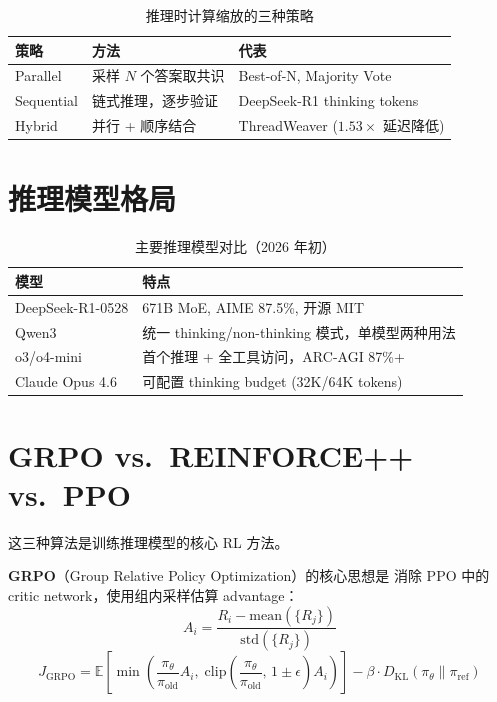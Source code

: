 \documentclass[
  customlatinfont = macos,
]{hkustthesis}
\begin{document}
\begin{table}[H]
\centering\small
\caption{推理时计算缩放的三种策略}
\begin{tabularx}{\linewidth}{l l X}
\toprule
\textbf{策略} & \textbf{方法} & \textbf{代表} \\
\midrule
Parallel   & 采样 $N$ 个答案取共识 & Best-of-N, Majority Vote \\
Sequential & 链式推理，逐步验证   & DeepSeek-R1 thinking tokens \\
Hybrid     & 并行 + 顺序结合     & ThreadWeaver ($1.53\times$ 延迟降低) \\
\bottomrule
\end{tabularx}
\end{table}

\section{推理模型格局}

\begin{table}[H]
\centering\small
\caption{主要推理模型对比（2026 年初）}
\label{tab:reasoning-models}
\begin{tabularx}{\linewidth}{l X}
\toprule
\textbf{模型} & \textbf{特点} \\
\midrule
DeepSeek-R1-0528 & 671B MoE, AIME 87.5\%, 开源 MIT \\
Qwen3            & 统一 thinking/non-thinking 模式，单模型两种用法 \\
o3/o4-mini       & 首个推理 + 全工具访问，ARC-AGI 87\%+ \\
Claude Opus 4.6  & 可配置 thinking budget (32K/64K tokens) \\
\bottomrule
\end{tabularx}
\end{table}

\section{GRPO vs.\ REINFORCE++ vs.\ PPO}

这三种算法是训练推理模型的核心 RL 方法。

\textbf{GRPO}（Group Relative Policy Optimization）的核心思想是
消除 PPO 中的 critic network，使用组内采样估算 advantage：
\begin{equation}
  A_i = \frac{R_i - \mathrm{mean}(\{R_j\})}{\mathrm{std}(\{R_j\})}
  \label{eq:grpo-advantage}
\end{equation}
\begin{equation}
  J_{\mathrm{GRPO}} = \mathbb{E}\!\left[
    \min\!\left(\frac{\pi_\theta}{\pi_{\mathrm{old}}} A_i,\;
    \mathrm{clip}\!\left(\frac{\pi_\theta}{\pi_{\mathrm{old}}},\,1\!\pm\!\epsilon\right) A_i\right)
  \right] - \beta \cdot D_{\mathrm{KL}}(\pi_\theta \| \pi_{\mathrm{ref}})
  \label{eq:grpo-objective}
\end{equation}
\end{document}
